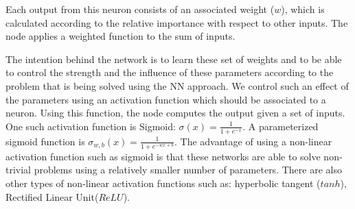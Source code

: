 Each output from this neuron consists of an associated weight ($w$), which is calculated according to the relative importance with respect to other inputs. The node applies a weighted function to the sum of inputs.

The intention behind the network is to learn these set of weights and to be able to control the strength and the influence of these parameters according to the problem that is being solved using the NN approach. We control such an effect of the parameters using an activation function which should be associated to a neuron. Using this function, the node computes the output given a set of inputs. One such activation function is Sigmoid: $\sigma(x) = \frac{1}{1+e^{-x}}$. A parameterized sigmoid function is $\sigma_{w,b}(x) = \frac{1}{1+e^{-wx+b}}$. The advantage of using a non-linear activation function such as sigmoid is that these networks are able to solve non-trivial problems using a relatively smaller number of parameters. 
There are also other types of non-linear activation functions such as: hyperbolic tangent  ($tanh$), Rectified Linear Unit($ReLU$). 


